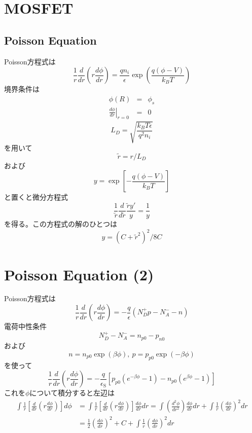 \documentclass[11pt,uplatex]{jsarticle}
\def\d#1#2{\frac{d #1}{d #2}}
\def\dd#1#2{\frac{d^2 #1}{d #2^2}}
\begin{document}
\section{MOSFET}
\subsection{Poisson Equation}
Poisson方程式は
\begin{equation}
 \frac{1}{r} \d{}{r}(r\d{\phi}{r}) =  \frac{q n_i}{\epsilon} \exp\left(\frac{q(\phi-V)}{k_B T}\right)
\end{equation}
境界条件は
\begin{eqnarray}
 \phi(R)&=&\phi_s \\
\left. \d{\phi}{r}\right|_{r=0}&=&0
 \end{eqnarray}
\begin{equation}
 L_D = \sqrt{\frac{k_B T \epsilon}{q^2 n_i}}
\end{equation}
を用いて
\begin{equation}
 \tilde{r}=r/L_D
\end{equation}
および
\begin{equation}
 y=\exp\left[ -\frac{q(\phi-V)}{k_B T} \right]
\end{equation}
と置くと微分方程式
\begin{equation}
\frac{1}{\tilde{r}} \d{}{\tilde{r}}\frac{\tilde{r}y'}{y} = \frac{1}{y}
\end{equation}
を得る。この方程式の解のひとつは
\begin{equation}
 y=(C + \tilde{r}^2)^2/8C
\end{equation}

\section{Poisson Equation (2)}
Poisson方程式は
\begin{equation}
 \frac{1}{r}\d{}{r}(r\d{\phi}{r}) =  -\frac{q}{\epsilon}
  (N_D^ + p - N_A^- - n)
\end{equation}
電荷中性条件
\begin{equation}
 N_D^+ - N_A^- = n_{p0}-p_{n0}
\end{equation}
および
\begin{equation}
 n=n_{p0} \exp(\beta \phi),\ p = p_{p0} \exp(-\beta\phi)
\end{equation}
を使って
\begin{equation}
 \frac{1}{r}\d{}{r}(r\d{\phi}{r})
  =-\frac{q}{\epsilon_{\mathrm{S}}}
[p_{p0}(e^{-\beta \phi} -1) - n_{p0} (e^{\beta \phi} -1)]
\end{equation}
これを$\phi$について積分すると左辺は
\begin{subequations}
\begin{align}
\int \frac{1}{r}[\d{}{r}(r \d{\phi}{r})]d\phi
  & =
  \int \frac{1}{r}[\d{}{r}(r \d{\phi}{r})]\d{\phi}{r} dr
  =\int (\dd{\phi}{r})\d{\phi}{r} d r +
  \int \frac{1}{r}(\d{\phi}{r})^2 dr \\
&= \frac{1}{2}(\d{\phi}{r})^2 + C + \int \frac{1}{r}(\d{\phi}{r})^2 dr 
\end{align}
\end{subequations}
\end{document}
